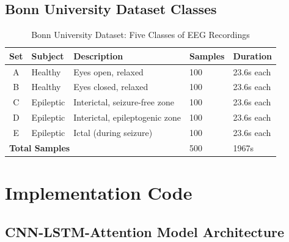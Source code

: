 \documentclass[12pt,a4paper]{article}
\begin{document}
\subsection{Bonn University Dataset Classes}

\begin{table}[H]
\centering
\caption{Bonn University Dataset: Five Classes of EEG Recordings}
\label{tab:bonn_data}
\begin{tabular}{clp{4cm}ll}
\toprule
\textbf{Set} & \textbf{Subject} & \textbf{Description} & \textbf{Samples} & \textbf{Duration} \\
\midrule
A & Healthy & Eyes open, relaxed & 100 & 23.6s each \\
B & Healthy & Eyes closed, relaxed & 100 & 23.6s each \\
C & Epileptic & Interictal, seizure-free zone & 100 & 23.6s each \\
D & Epileptic & Interictal, epileptogenic zone & 100 & 23.6s each \\
E & Epileptic & Ictal (during seizure) & 100 & 23.6s each \\
\midrule
\multicolumn{3}{l}{\textbf{Total Samples}} & 500 & 1967s \\
\bottomrule
\end{tabular}
\end{table}

\section{Implementation Code}

\subsection{CNN-LSTM-Attention Model Architecture}
\end{document}
